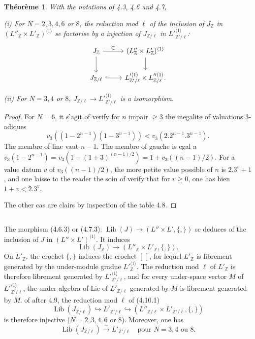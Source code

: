 \documentclass[11pt,a4paper]{article}
\theoremstyle{plain}
\newtheorem{theorem}{Th\'eor\`eme}[section]
\theoremstyle{definition}
\DeclareMathOperator{\Lib}{Lib}
\newcommand{\Z}{\mathbb{Z}}
\begin{document}
\begin{theorem}\label{thm:4.9}
With the notations of 4.3, 4.6 and 4.7,

\emph{(i)} For $N=2,3,4,6$ or $8$, the reduction mod $\ell$ of the inclusion of $J_\Z$ in $(L''_\Z \times L'_\Z)^{\langle 1 \rangle}$ se factorise by a injection of $J_{\Z/\ell}$ in $L'^{\langle 1 \rangle}_{\Z'/\ell}$:
\begin{equation}\label{eq:4.9.1}
\begin{tikzcd}
J_\Z \arrow{r}{\subset} \arrow{d} & (L''_\Z \times L'_\Z)^{\langle 1 \rangle} \arrow{d} \\
J_{\Z/\ell} \arrow[hook]{r} & L'^{\langle 1 \rangle}_{\Z'/\ell} \times L''^{\langle 1 \rangle}_{\Z/\ell}.
\end{tikzcd}
\end{equation}

\emph{(ii)} For $N=3,4$ or $8$, $J_{\Z/\ell} \to L'^{\langle 1 \rangle}_{\Z'/\ell}$ is a isomorphism.
\end{theorem}

\begin{proof}
For $N=6$, it s'agit of verify for $n$ impair $\geq 3$ the inegalite of valuations $3$-adiques
\[
v_3((1-2^{n-1})(1-3^{n-1})) < v_3(2.2^{n-1}.3^{n-1}).
\]
The membre of line vaut $n-1$. The membre of gauche is egal a $v_3(1-2^{n-1}) = v_3(1-(1+3)^{(n-1)/2}) = 1+v_3((n-1)/2)$. For a value datum $v$ of $v_3((n-1)/2)$, the more petite value possible of $n$ is $2.3^v+1$, and one laisse to the reader the soin of verify that for $v \geq 0$, one has bien $1+v < 2.3^v$.

The other cas are clairs by inspection of the table 4.8.
\end{proof}

\subsection{}
The morphism (4.6.3) or (4.7.3): $\Lib(J) \to (L'' \times L', \{,\})$ se deduces of the inclusion of $J$ in $(L'' \times L')^{\langle 1 \rangle}$. It induces
\begin{equation}\label{eq:4.10.1}
\Lib(J_\Z) \to (L''_\Z \times L'_\Z, \{,\}).
\end{equation}
On $L'_\Z$, the crochet $\{,\}$ induces the crochet $[\,]$, for lequel $L'_\Z$ is librement generated by the under-module gradue $L'^{\langle 1 \rangle}_{\Z}$. The reduction mod $\ell$ of $L'_\Z$ is therefore librement generated by $L'^{\langle 1 \rangle}_{\Z'/\ell}$, and for every under-space vector $M$ of $L'^{\langle 1 \rangle}_{\Z'/\ell}$, the under-algebra of Lie of $L'_{\Z/\ell}$ generated by $M$ is librement generated by $M$. of after 4.9, the reduction mod $\ell$ of (4.10.1)
\begin{equation}\label{eq:4.10.2}
\Lib(J_{\Z/\ell}) \hookrightarrow L'_{\Z'/\ell} \hookrightarrow (L''_{\Z/\ell} \times L'_{\Z'/\ell}, \{,\})
\end{equation}
is therefore injective ($N=2,3,4,6$ or $8$). Moreover, one has
\begin{equation}\label{eq:4.10.3}
\Lib(J_{\Z/\ell}) \xrightarrow{\sim} L'_{\Z'/\ell} \quad \text{pour }N=3,4\text{ ou }8.
\end{equation}
\end{document}
